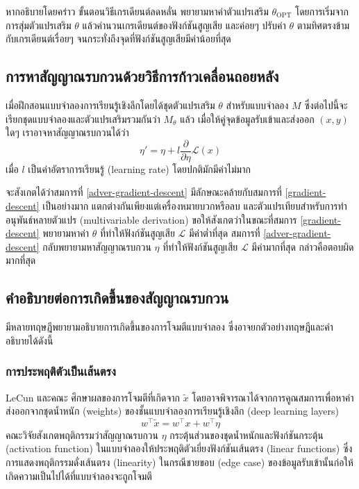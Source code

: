 \documentclass{cpepaper}
\begin{document}
หากอธิบายโดยคร่าว ขั้นตอนวิธีเกรเดียนต์ลดหลั่น พยายามหาค่าตัวแปรเสริม $\theta_{\textrm{OPT}}$ โดยการเริ่มจากการสุ่มตัวแปรเสริม $\theta$ แล้วคำนวนเกรเดียนต์ของฟังก์ชันสูญเสีย และค่อยๆ ปรับค่า $\theta$ ตามทิศตรงข้ามกับเกรเดียนต์เรื่อยๆ จนกระทั่งถึงจุดที่ฟังก์ชันสูญเสียมีค่าน้อยที่สุด

\subsection{การหาสัญญาณรบกวนด้วยวิธีการก้าวเคลื่อนถอยหลัง}

เมื่อฝึกสอนแบบจำลองการเรียนรู้เชิงลึกโดยได้ชุดตัวแปรเสริม $\theta$ สำหรับแบบจำลอง $M$ ซึ่งต่อไปนี้จะเรียกชุดแบบจำลองและตัวแปรเสริมรวมกันว่า $M_\theta$ แล้ว เมื่อให้คู่จุดข้อมูลรับเข้าและส่งออก $(x, y)$ ใดๆ เราอาจหาสัญญาณรบกวนได้ว่า
\begin{equation}
    \eta' = \eta + l \frac{\partial}{\partial \eta} \mathcal{L}\left( x \right)
    \label{adver-gradient-descent}
\end{equation}
เมื่อ $l$ เป็นค่าอัตราการเรียนรู้ (learning rate) โดยปกติมักมีค่าไม่มาก

จะสังเกตได้ว่าสมการที่ \ref{adver-gradient-descent} มีลักษณะคล้ายกับสมการที่ \ref{gradient-descent} เป็นอย่างมาก แตกต่างกันเพียงแต่เครื่องหมายบวกหรือลบ และตัวแปรเทียบสำหรับการทำอนุพันธ์หลายตัวแปร (multivariable derivation) ขอให้สังเกตว่าในขณะที่สมการ \ref{gradient-descent} พยายามหาค่า $\theta$ ที่ทำให้ฟังก์ชันสูญเสีย $\mathcal{L}$ มีค่าต่ำที่สุด สมการที่ \ref{adver-gradient-descent} กลับพยายามหาสัญญาณรบกวน $\eta$ ที่ทำให้ฟังก์ชันสูญเสีย $\mathcal{L}$ มีค่ามากที่สุด กล่าวคือตอบผิดมากที่สุด

\subsection{คำอธิบายต่อการเกิดขึ้นของสัญญาณรบกวน}

มีหลายทฤษฎีพยายามอธิบายการเกิดขึ้นของการโจมตีแบบจำลอง ซึ่งอาจยกตัวอย่างทฤษฎีและคำอธิบายได้ดังนี้

\subsubsection{การประพฤติตัวเป็นเส้นตรง}
LeCun และคณะ \cite{1412.6572} ศึกษาผลของการโจมตีที่เกิดจาก $\tilde{x}$ โดยอาจพิจารณาได้จากการคูณสมการเพื่อหาค่าส่งออกจากชุดน้ำหนัก (weights) ของชั้นแบบจำลองการเรียนรู้เชิงลึก (deep learning layers) 
\begin{equation}
    w^\top\tilde{x} = w^\top x + w^\top \eta
\end{equation}
คณะวิจัยสังเกตพฤติกรรมว่าสัญญาณรบกวน $\eta$ กระตุ้นส่วนของชุดน้ำหนักและฟังก์ชันกระตุ้น (activation function) ในแบบจำลองให้ประพฤติตัวเยี่ยงฟังก์ชันเส้นตรง (linear functions) ซึ่งการแสดงพฤติกรรมดั่งเส้นตรง (linearity) ในกรณีชายขอบ (edge case) ของข้อมูลรับเข้านั้นก่อให้เกิดความเป็นไปได้ที่แบบจำลองจะถูกโจมตี
\end{document}
